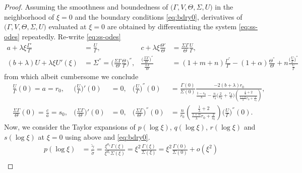 \documentclass[a4paper,11pt]{article}
\def\tg{{\tilde{\gamma}}}
\def\ts{{\tilde{\sigma}}}
\theoremstyle{remark}
\begin{document}
\begin{proof}
Assuming the smoothness and boundedness of $\big(\Gamma,V,\Theta,\Sigma,U\big)$ in the neighborhood of $\xi=0$ and the boundary conditions \eqref{eq:bdry0}, derivatives of $\big(\Gamma,V,\Theta,\Sigma,U\big)$ evaluated at $\xi=0$ are obtained by differentiating the system \eqref{eq:ss-odes} repeatedly.
Re-write \eqref{eq:ss-odes}
\begin{align*}
  a + \lambda\xi\frac{\Gamma'}{\Gamma} &= \frac{U}{\Gamma}, &
  c + \lambda\xi\frac{\Theta'}{\Theta} &= \frac{\Sigma\Gamma}{\Theta} \frac{U}{\Gamma},\\
  (b+\lambda)U  + \lambda \xi U'(\xi) &= \Sigma^{''} = \Big(\frac{\Sigma\Gamma}{\Theta} \frac{\Theta}{\Gamma}\Big)^{''}, &
  \frac{\Big(\frac{\Sigma\Gamma}{\Theta}\Big)^{''}}{\frac{\Sigma\Gamma}{\Theta}} &= (1+m+n)\frac{\Gamma^{''}}{\Gamma}-(1+\alpha) \frac{\Theta^{''}}{\Theta} + n \frac{ \big(\frac{U}{\Gamma}\big)^{''}}{\frac{U}{\Gamma}}
\end{align*}
from which albeit cumbersome we conclude
\begin{align*}
&\frac{U}{\Gamma}(0) = a = r_0,  & \Big(\frac{U}{\Gamma}\Big)'(0)&=0, & \Big(\frac{U}{\Gamma}\Big)^{''}(0) &= \frac{\Gamma(0)}{\Sigma(0)} \frac{-2(b+\lambda)r_0}{\frac{1-s_0}{\lambda}-\frac{n}{r_0}\Big(\frac{2}{s_0} + \frac{r_0}{\lambda}\Big)\left(\frac{ \frac{1}{\lambda}+2}{ \frac{1+\alpha}{\lambda}r_0 + \frac{2}{s_0}}\right)},\\
&\frac{\Sigma\Gamma}{\Theta}(0) = \frac{c}{a} = s_0,  & \Big(\frac{\Sigma\Gamma}{\Theta}\Big)'(0)&=0, &
\Big(\frac{\Sigma\Gamma}{\Theta}\Big)^{''}(0) &= \frac{n}{r_0} \left(\frac{ \frac{1}{\lambda}+2 }{ \frac{1+\alpha}{\lambda}r_0 + \frac{2}{s_0}}\right)\Big(\frac{U}{\Gamma}\Big)^{''}(0).
\end{align*}
Now, we consider the Taylor expansions of $p(\log\xi)$, $q(\log\xi)$, $r(\log\xi)$ and $s(\log\xi)$ at $\xi=0$ using above and \eqref{eq:bdry0}.
\begin{align*}
 p(\log\xi) &= \frac{ \tg }{\ts} = \frac{ \xi^{a_1} \Gamma(\xi)}{\xi^{d_1} \Sigma(\xi)} = \xi^2\frac{\Gamma(\xi)}{\Sigma(\xi)} = \xi^2\frac{\Gamma(0)}{\Sigma(0)} + o(\xi^2) \\

\end{align*}
\end{proof}
\end{document}

